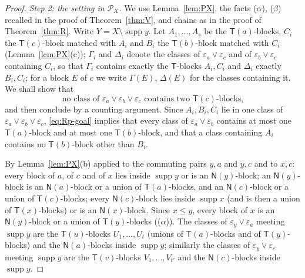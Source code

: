 \documentclass[11pt]{amsart}
\theoremstyle{definition}
\renewcommand{\P}{\mathcal{P}}
\newcommand{\supp}{\operatorname{supp}}
\newcommand{\T}{\mathsf{T}}
\newcommand{\N}{\mathsf{N}}
\begin{document}
\begin{proof}
\smallskip
\emph{Step 2: the setting in $\P_X$.} We use Lemma~\ref{lem:PX}, the facts ($\alpha$), ($\beta$) recalled in the proof of Theorem~\ref{thm:V}, and chains as in the proof of Theorem~\ref{thm:R}. Write $Y=X\setminus\supp y$. Let $A_1,\dots,A_s$ be the $\T(a)$-blocks, $C_i$ the $\T(c)$-block matched with $A_i$ and $B_i$ the $\T(b)$-block matched with $C_i$ (Lemma~\ref{lem:PX}(c)); $\Gamma_i$ and $\Delta_i$ denote the classes of $\varepsilon_a\vee\varepsilon_c$ and of $\varepsilon_b\vee\varepsilon_c$ containing $C_i$, so that $\Gamma_i$ contains exactly the $\T$-blocks $A_i,C_i$ and $\Delta_i$ exactly $B_i,C_i$; for a block $E$ of $c$ we write $\Gamma(E)$, $\Delta(E)$ for the classes containing it. We shall show that
\begin{equation}\label{eq:Rp-goal}
\text{no class of }\varepsilon_a\vee\varepsilon_b\vee\varepsilon_c\text{ contains two }\T(c)\text{-blocks,}
\end{equation}
and then conclude by a counting argument. Since $A_i,B_i,C_i$ lie in one class of $\varepsilon_a\vee\varepsilon_b\vee\varepsilon_c$, \eqref{eq:Rp-goal} implies that every class of $\varepsilon_a\vee\varepsilon_b$ contains at most one $\T(a)$-block and at most one $\T(b)$-block, and that a class containing $A_i$ contains no $\T(b)$-block other than $B_i$.

By Lemma~\ref{lem:PX}(b) applied to the commuting pairs $y,a$ and $y,c$ and to $x,c$: every block of $a$, of $c$ and of $x$ lies inside $\supp y$ or is an $\N(y)$-block; an $\N(y)$-block is an $\N(a)$-block or a union of $\T(a)$-blocks, and an $\N(c)$-block or a union of $\T(c)$-blocks; every $\N(c)$-block lies inside $\supp x$ (and is then a union of $\T(x)$-blocks) or is an $\N(x)$-block. Since $x\le y$, every block of $x$ is an $\N(y)$-block or a union of $\T(y)$-blocks (($\alpha$)). The classes of $\varepsilon_y\vee\varepsilon_a$ meeting $\supp y$ are the $\T(u)$-blocks $U_1,\dots,U_t$ (unions of $\T(a)$-blocks and of $\T(y)$-blocks) and the $\N(a)$-blocks inside $\supp y$; similarly the classes of $\varepsilon_y\vee\varepsilon_c$ meeting $\supp y$ are the $\T(v)$-blocks $V_1,\dots,V_{t'}$ and the $\N(c)$-blocks inside $\supp y$.


\end{proof}
\end{document}
